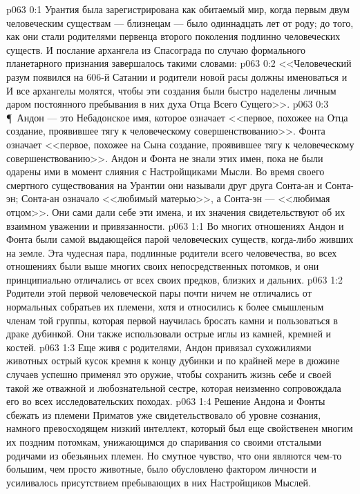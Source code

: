 \vs p063 0:1 Урантия была зарегистрирована как обитаемый мир, когда первым двум человеческим существам --- близнецам --- было одиннадцать лет от роду; до того, как они стали родителями первенца второго поколения подлинно человеческих существ. И послание архангела из Спасограда по случаю формального планетарного признания завершалось такими словами:
\vs p063 0:2 <<Человеческий разум появился на 606\hyp{}й Сатании и родители новой расы должны именоваться  и  И все архангелы молятся, чтобы эти создания были быстро наделены личным даром постоянного пребывания в них духа Отца Всего Сущего>>.
\vs p063 0:3 \P\ Андон --- это Небадонское имя, которое означает <<первое, похожее на Отца создание, проявившее тягу к человеческому совершенствованию>>. Фонта означает <<первое, похожее на Сына создание, проявившее тягу к человеческому совершенствованию>>. Андон и Фонта не знали этих имен, пока не были одарены ими в момент слияния с Настройщиками Мысли. Во время своего смертного существования на Урантии они называли друг друга Сонта\hyp{}ан и Сонта\hyp{}эн; Сонта\hyp{}ан означало <<любимый матерью>>, а Сонта\hyp{}эн --- <<любимая отцом>>. Они сами дали себе эти имена, и их значения свидетельствуют об их взаимном уважении и привязанности.
\vs p063 1:1 Во многих отношениях Андон и Фонта были самой выдающейся парой человеческих существ, когда\hyp{}либо живших на земле. Эта чудесная пара, подлинные родители всего человечества, во всех отношениях были выше многих своих непосредственных потомков, и они принципиально отличались от всех своих предков, близких и дальних.
\vs p063 1:2 Родители этой первой человеческой пары почти ничем не отличались от нормальных собратьев их племени, хотя и относились к более смышленым членам той группы, которая первой научилась бросать камни и пользоваться в драке дубинкой. Они также использовали острые иглы из камней, кремней и костей.
\vs p063 1:3 Еще живя с родителями, Андон привязал сухожилиями животных острый кусок кремня к концу дубинки и по крайней мере в дюжине случаев успешно применял это оружие, чтобы сохранить жизнь себе и своей такой же отважной и любознательной сестре, которая неизменно сопровождала его во всех исследовательских походах.
\vs p063 1:4 Решение Андона и Фонты сбежать из племени Приматов уже свидетельствовало об уровне сознания, намного превосходящем низкий интеллект, который был еще свойственен многим их поздним потомкам, унижающимся до спаривания со своими отсталыми родичами из обезьяньих племен. Но смутное чувство, что они являются чем\hyp{}то большим, чем просто животные, было обусловлено фактором личности и усиливалось присутствием пребывающих в них Настройщиков Мыслей.
